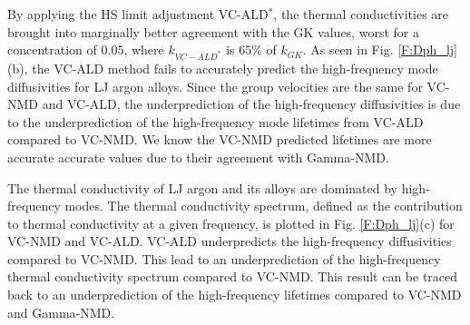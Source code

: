 \documentclass[aps,prb,onecolumn,preprint,footinbib,superscriptaddress,amsmath,amssymb,floatfix]{revtex4}
\newcommand{\kw}{\mspace{-4.0mu}\left(\mspace{-8.0mu}
\begin{smallmatrix}&\pmb{\kappa} \\&\omega\end{smallmatrix}
\mspace{-3.0mu}\right)}
\begin{document}
By applying the HS limit adjustment VC-ALD$^*$, the thermal 
conductivities are brought into marginally better agreement with 
the GK values, worst for a concentration of $0.05$, where 
$k_{VC-ALD^*}$ is $65\%$ of $ k_{GK}$.  
As seen in Fig. \ref{F:Dph_lj}(b), the VC-ALD method fails to 
accurately predict the high-frequency mode diffusivities for 
LJ argon alloys. Since the group velocities are the same for 
VC-NMD and VC-ALD, the underprediction of the high-frequency 
diffusivities is
due to the underprediction of the high-frequency 
mode lifetimes from VC-ALD compared to VC-NMD. We know the VC-NMD 
predicted lifetimes are more accurate accurate values due to their 
agreement with Gamma-NMD. 

The thermal conductivity of LJ argon and its alloys are dominated 
by high-frequency modes. The thermal conductivity spectrum, defined as 
the contribution to thermal conductivity at a given frequency, 
is plotted in Fig. \ref{F:Dph_lj}(c) for VC-NMD and VC-ALD. 
VC-ALD underpredicts the high-frequency 
diffusivities compared to VC-NMD. This lead to an 
underprediction of the high-frequency thermal conductivity spectrum 
compared to VC-NMD. This result can be traced back 
to an underprediction of the high-frequency lifetimes compared to 
VC-NMD and Gamma-NMD. 


\end{document}
